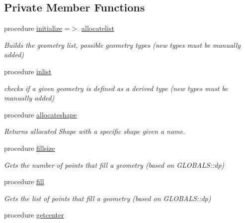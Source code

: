\subsection*{Private Member Functions}
\begin{DoxyCompactItemize}
\item 
procedure \mbox{\hyperlink{structgeometry__mod_1_1geometry__class_a97a9a90ff4143d41fe57eb0e6d1c76a1}{initialize}} =$>$ \mbox{\hyperlink{namespacegeometry__mod_a1b6f259b0b6be71e02ffae7670f7d8ba}{allocatelist}}
\begin{DoxyCompactList}\small\item\em Builds the geometry list, possible geometry types (new types must be manually added) \end{DoxyCompactList}\item 
procedure \mbox{\hyperlink{structgeometry__mod_1_1geometry__class_a6dfcc19f822da875bebc58c3bf26e999}{inlist}}
\begin{DoxyCompactList}\small\item\em checks if a given geometry is defined as a derived type (new types must be manually added) \end{DoxyCompactList}\item 
procedure \mbox{\hyperlink{structgeometry__mod_1_1geometry__class_a435975f73e28fc8c9f04b47c390cb089}{allocateshape}}
\begin{DoxyCompactList}\small\item\em Returns allocated Shape with a specific shape given a name. \end{DoxyCompactList}\item 
procedure \mbox{\hyperlink{structgeometry__mod_1_1geometry__class_a75f5a37d0b38c8baf66ee5089ea44d7a}{fillsize}}
\begin{DoxyCompactList}\small\item\em Gets the number of points that fill a geometry (based on G\+L\+O\+B\+A\+L\+S\+::dp) \end{DoxyCompactList}\item 
procedure \mbox{\hyperlink{structgeometry__mod_1_1geometry__class_a0afee5607f0e2443a862741e40794368}{fill}}
\begin{DoxyCompactList}\small\item\em Gets the list of points that fill a geometry (based on G\+L\+O\+B\+A\+L\+S\+::dp) \end{DoxyCompactList}\item 
procedure \mbox{\hyperlink{structgeometry__mod_1_1geometry__class_a691891378a677185f2f13e736f68ff11}{getcenter}}

\end{DoxyCompactItemize}
